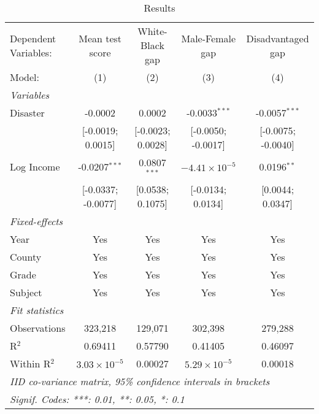 
\begin{table}[htbp]
   \centering
   \caption{\label{MainResults} Results}
   \begin{tabular}{lcccc}
      \tabularnewline\midrule\midrule
      Dependent Variables: & Mean test score       & White-Black gap   & Male-Female gap        & Disadvantaged gap\\
      Model:               & (1)                   & (2)               & (3)                    & (4)\\
      \midrule \emph{Variables} &   &   &   &  \\
      Disaster             & -0.0002               & 0.0002            & -0.0033$^{***}$        & -0.0057$^{***}$\\
                           & [-0.0019; 0.0015]     & [-0.0023; 0.0028] & [-0.0050; -0.0017]     & [-0.0075; -0.0040]\\
      Log Income           & -0.0207$^{***}$       & 0.0807$^{***}$    & $-4.41\times 10^{-5}$ & 0.0196$^{**}$\\
                           & [-0.0337; -0.0077]    & [0.0538; 0.1075]  & [-0.0134; 0.0134]      & [0.0044; 0.0347]\\
      \midrule \emph{Fixed-effects} &   &   &   &  \\
      Year                 & Yes                   & Yes               & Yes                    & Yes\\
      County               & Yes                   & Yes               & Yes                    & Yes\\
      Grade                & Yes                   & Yes               & Yes                    & Yes\\
      Subject              & Yes                   & Yes               & Yes                    & Yes\\
      \midrule \emph{Fit statistics} &   &   &   &  \\
      Observations         & 323,218               & 129,071           & 302,398                & 279,288\\
      R$^2$                & 0.69411               & 0.57790           & 0.41405                & 0.46097\\
      Within R$^2$         & $3.03\times 10^{-5}$ & 0.00027           & $5.29\times 10^{-5}$  & 0.00018\\
      \midrule\midrule\multicolumn{5}{l}{\emph{IID co-variance matrix, 95\% confidence intervals in brackets}}\\
      \multicolumn{5}{l}{\emph{Signif. Codes: ***: 0.01, **: 0.05, *: 0.1}}\\
   \end{tabular}
\end{table}


